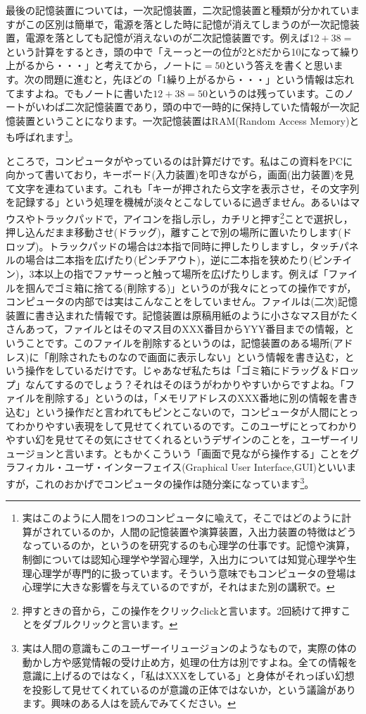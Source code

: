 \documentclass{ltjsbook}
\begin{document}
最後の記憶装置については，一次記憶装置，二次記憶装置と種類が分かれていますがこの区別は簡単で，電源を落とした時に記憶が消えてしまうのが一次記憶装置，電源を落としても記憶が消えないのが二次記憶装置です。例えば$12+38=$という計算をするとき，頭の中で「えーっと一の位が2と8だから10になって繰り上がるから・・・」と考えてから，ノートに$=50$という答えを書くと思います。次の問題に進むと，先ほどの「1繰り上がるから・・・」という情報は忘れてますよね。でもノートに書いた$12+38=50$というのは残っています。このノートがいわば二次記憶装置であり，頭の中で一時的に保持していた情報が一次記憶装置ということになります。一次記憶装置はRAM(Random Access Memory)とも呼ばれます\footnote{実はこのように人間を1つのコンピュータに喩えて，そこではどのように計算がされているのか，人間の記憶装置や演算装置，入出力装置の特徴はどうなっているのか，というのを研究するのも心理学の仕事です。記憶や演算，制御については認知心理学や学習心理学，入出力については知覚心理学や生理心理学が専門的に扱っています。そういう意味でもコンピュータの登場は心理学に大きな影響を与えているのですが，それはまた別の講釈で。}。

ところで，コンピュータがやっているのは計算だけです。私はこの資料をPCに向かって書いており，キーボード(入力装置)を叩きながら，画面(出力装置)を見て文字を連ねています。これも「キーが押されたら文字を表示させ，その文字列を記録する」という処理を機械が淡々とこなしているに過ぎません。あるいはマウスやトラックパッドで，アイコンを指し示し，カチリと押す\footnote{押すときの音から，この操作をクリックclickと言います。2回続けて押すことをダブルクリックと言います。}ことで選択し，押し込んだまま移動させ(ドラッグ)，離すことで別の場所に置いたりします(ドロップ)。トラックパッドの場合は2本指で同時に押したりしますし，タッチパネルの場合は二本指を広げたり(ピンチアウト)，逆に二本指を狭めたり(ピンチイン)，3本以上の指でファサーっと触って場所を広げたりします。例えば「ファイルを掴んでゴミ箱に捨てる(削除する)」というのが我々にとっての操作ですが，コンピュータの内部では実はこんなことをしていません。ファイルは(二次)記憶装置に書き込まれた情報です。記憶装置は原稿用紙のように小さなマス目がたくさんあって，ファイルとはそのマス目のXXX番目からYYY番目までの情報，ということです。このファイルを削除するというのは，記憶装置のある場所(アドレス)に「削除されたものなので画面に表示しない」という情報を書き込む，という操作をしているだけです。じゃあなぜ私たちは「ゴミ箱にドラッグ＆ドロップ」なんてするのでしょう？それはそのほうがわかりやすいからですよね。「ファイルを削除する」というのは，「メモリアドレスのXXX番地に別の情報を書き込む」という操作だと言われてもピンとこないので，コンピュータが人間にとってわかりやすい表現をして見せてくれているのです。このユーザにとってわかりやすい幻を見せてその気にさせてくれるというデザインのことを，ユーザーイリュージョンと言います。ともかくこういう「画面で見ながら操作する」ことをグラフィカル・ユーザ・インターフェイス(Graphical User Interface,GUI)といいますが，これのおかげでコンピュータの操作は随分楽になっています\footnote{実は人間の意識もこのユーザーイリュージョンのようなもので，実際の体の動かし方や感覚情報の受け止め方，処理の仕方は別ですよね。全ての情報を意識に上げるのではなく，「私はXXXをしている」と身体がそれっぽい幻想を投影して見せてくれているのが意識の正体ではないか，という議論があります。興味のある人は\citet{トールノーレットランダーシュ2002}を読んでみてください。}。
\end{document}
